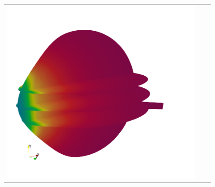 \begin{figure}
\begin{tabular}{*{3}{c}}
        \includegraphics[width=\mysize]{fig/eye/results/toolbox/mumax-linear.png} \\


\end{tabular}
\end{figure}
